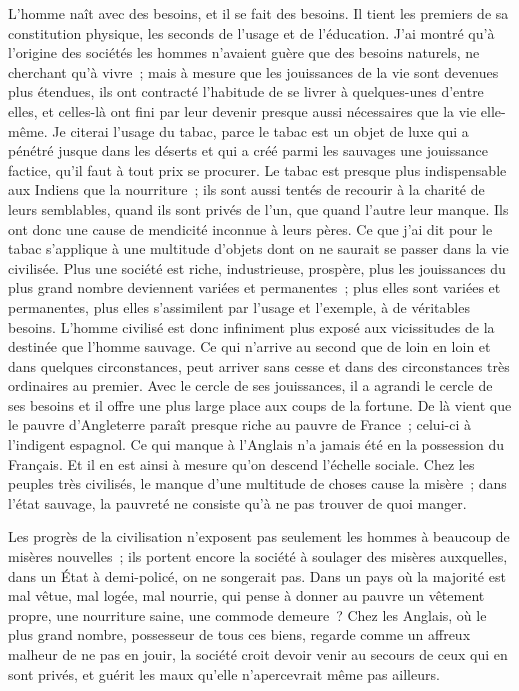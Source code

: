 \documentclass[french,twoside]{book} %
\begin{document}
\noindent L'homme naît avec des besoins, et il se fait des besoins. Il tient les premiers de sa constitution physique, les seconds de l’usage et de l’éducation. J'ai montré qu’à l’origine des sociétés les hommes n’avaient guère que des besoins naturels, ne cherchant qu’à vivre ; mais à mesure que les jouissances de la vie sont devenues plus étendues, ils ont contracté l’habitude de se livrer à quelques-unes d’entre elles, et celles-là ont fini par leur devenir presque aussi nécessaires que la vie elle-même. Je citerai l’usage du tabac, parce le tabac est un objet de luxe qui a pénétré jusque dans les déserts et qui a créé parmi les sauvages une jouissance factice, qu’il faut à tout prix se procurer. Le tabac est presque plus indispensable aux Indiens que la nourriture ; ils sont aussi tentés de recourir à la charité de leurs semblables, quand ils sont privés de l’un, que quand l’autre leur manque. Ils ont donc une cause de mendicité inconnue à leurs pères. Ce que j’ai dit pour le tabac s’applique à une multitude d’objets dont on ne saurait se passer dans la vie civilisée. Plus une société est riche, industrieuse, prospère, plus les jouissances du plus grand nombre deviennent variées et permanentes ; plus elles sont variées et permanentes, plus elles s’assimilent par l’usage et l’exemple, à de véritables besoins. L'homme civilisé est donc infiniment plus exposé aux vicissitudes de la destinée que l’homme sauvage. Ce qui n’arrive au second que de loin en loin et dans quelques circonstances, peut arriver sans cesse et dans des circonstances très ordinaires au premier. Avec le cercle de ses jouissances, il a agrandi le cercle de ses besoins et il offre une plus large place aux coups de la fortune. De là vient que le pauvre d’Angleterre paraît presque riche au pauvre de France ; celui-ci à l’indigent espagnol. Ce qui manque à l’Anglais n’a jamais été en la possession du Français. Et il en est ainsi à mesure qu’on descend l’échelle sociale. Chez les peuples très civilisés, le manque d’une multitude de choses cause la misère ; dans l’état sauvage, la pauvreté ne consiste qu’à ne pas trouver de quoi manger.\par
Les progrès de la civilisation n’exposent pas seulement les hommes à beaucoup de misères nouvelles ; ils portent encore la société à soulager des misères auxquelles, dans un État à demi-policé, on ne songerait pas. Dans un pays où la majorité est mal vêtue, mal logée, mal nourrie, qui pense à donner au pauvre un vêtement propre, une nourriture saine, une commode demeure ? Chez les Anglais, où le plus grand nombre, possesseur de tous ces biens, regarde comme un affreux malheur de ne pas en jouir, la société croit devoir venir au secours de ceux qui en sont privés, et guérit les maux qu’elle n’apercevrait même pas ailleurs.\par
\end{document}
